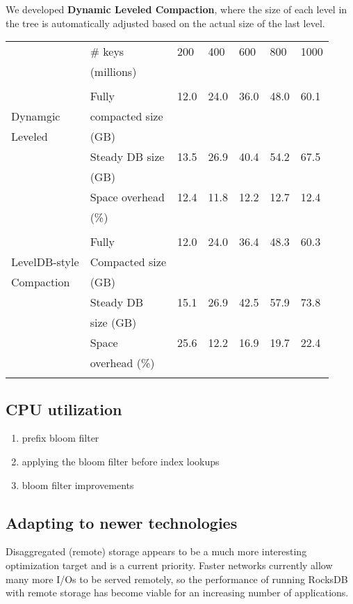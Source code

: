 \documentclass[11pt]{article}
\begin{document}
We developed \textbf{Dynamic Leveled Compaction}, where the size of each level in the tree is automatically
adjusted based on the actual size of the last level.

\begin{center}
\begin{tabular}{|l|l|l|l|l|l|l|}
\hline
 & \# keys & 200 & 400 & 600 & 800 & 1000 \\
 & (millions) & & & & & \\
 & & & & & & \\
\hline
 & Fully & 12.0 & 24.0 & 36.0 & 48.0 & 60.1 \\
Dynamgic & compacted size & & & & & \\
Leveled & (GB) & & & & & \\
\cline{2-7}
 & Steady DB size & 13.5 & 26.9 & 40.4 & 54.2 & 67.5 \\
 & (GB) & & & & & \\
\cline{2-7}
 & Space overhead & 12.4 & 11.8 & 12.2 & 12.7 & 12.4 \\
 & (\%) & & & & & \\
 & & & & & & \\
\hline
 & Fully & 12.0 & 24.0 & 36.4 & 48.3 & 60.3 \\
LevelDB-style & Compacted size & & & & & \\
Compaction & (GB) & & & & & \\
\cline{2-7}
 & Steady DB & 15.1 & 26.9 & 42.5 & 57.9 & 73.8 \\
 & size (GB) & & & & & \\
\cline{2-7}
 & Space & 25.6 & 12.2 & 16.9 & 19.7 & 22.4 \\
 & overhead (\%) & & & & & \\
 & & & & & & \\
\hline
\end{tabular}
\end{center}
\subsection{CPU utilization}
\label{sec:org68fb47b}
\begin{enumerate}
\item prefix bloom filter
\item applying the bloom filter before index lookups
\item bloom filter improvements
\end{enumerate}
\subsection{Adapting to newer technologies}
\label{sec:org00cd418}
Disaggregated (remote) storage appears to be a much more interesting optimization target and is a
current priority. Faster networks currently allow many more I/Os to be served remotely, so the
performance of running RocksDB with remote storage has become viable for an increasing number of applications.
\end{document}
